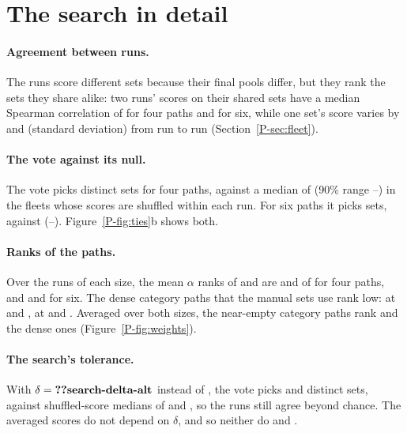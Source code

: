 

\section{The search in detail}
\label{app:search}

\paragraph{Agreement between runs.} The runs score different sets because their final pools
differ, but they rank the sets they share alike: two runs' scores on their shared sets have a median
Spearman correlation of  for four paths and  for six, while
one set's score varies by  and  (standard deviation) from
run to run (Section~\ref*{P-sec:fleet}).

\paragraph{The vote against its null.} The vote picks  distinct sets for four
paths, against a median of  (90\% range
--) in the  fleets whose scores
are shuffled within each run. For six paths it picks  sets, against
 (--). Figure~\ref*{P-fig:ties}b
shows both.

\paragraph{Ranks of the paths.} Over the  runs of each size, the mean $\alpha$
ranks of  and  are  and  of
 for four paths, and  and  for six. The
dense category paths that the manual sets use rank low:  at  and
,  at  and . Averaged over both
sizes, the near-empty category paths rank  and the dense ones
 (Figure~\ref*{P-fig:weights}).

\paragraph{The search's tolerance.} With $\delta = \val{search-delta-alt}$ instead of
, the vote picks  and  distinct
sets, against shuffled-score medians of  and
, so the runs still agree beyond chance. The averaged scores do not
depend on $\delta$, and so neither do  and .

